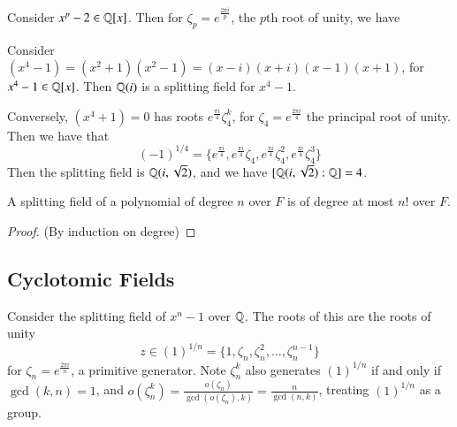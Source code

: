 \documentclass[12pt, a4paper, oneside, openright, titlepage]{book}
\begin{document}
\begin{eg}
    Consider $x^p - 2 \in \mathbb Q[x]$. Then for $\zeta_p = e^{\frac{2\pi i}{p}}$, the $p$th root of unity, we have 
    \begin{center}
    \end{center}
\end{eg}

\begin{eg}
    Consider $(x^4 -1) = (x^2+1)(x^2-1) = (x-i)(x+i)(x-1)(x+1)$, for $x^4-1 \in \mathbb Q[x]$. Then $\mathbb Q(i)$ is a splitting field for $x^4-1$. 

    Conversely, $(x^4+1) = 0$ has roots $e^{\frac{\pi i}{4}}\zeta_4^k$, for $\zeta_4 = e^{\frac{2\pi i}{4}}$ the principal root of unity. Then we have that \begin{equation*}
        (-1)^{1/4} = \{e^{\frac{\pi i}{4}}, e^{\frac{\pi i}{4}}\zeta_4, e^{\frac{\pi i}{4}}\zeta_4^2, e^{\frac{\pi i}{4}}\zeta_4^3\} 
    \end{equation*}
    Then the splitting field is $\mathbb Q(i,\sqrt{2})$, and we have $[\mathbb Q(i,\sqrt{2}):\mathbb Q] = 4$.
\end{eg}



\begin{prop}
    A splitting field of a polynomial of degree $n$ over $F$ is of degree at most $n!$ over $F$.
\end{prop}
\begin{proof}
    (By induction on degree)
\end{proof}


\subsection{Cyclotomic Fields}

Consider the splitting field of $x^n -1$ over $\mathbb Q$. The roots of this are the roots of unity $$z \in (1)^{1/n} = \{1, \zeta_n,\zeta_n^2,...,\zeta_n^{n-1}\}$$ for $\zeta_n = e^{\frac{2\pi i}{n}}$, a primitive generator. Note $\zeta_n^k$ also generates $(1)^{1/n}$ if and only if $\gcd(k,n) = 1$, and $o(\zeta_n^k) = \frac{o(\zeta_n)}{\gcd(o(\zeta_n),k)} = \frac{n}{\gcd(n,k)}$, treating $(1)^{1/n}$ as a group. 
\end{document}
